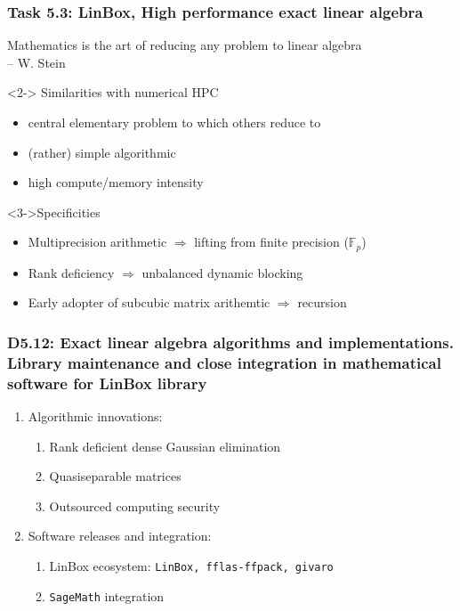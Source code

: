\documentclass{beamer}
\begin{document}
\begin{frame}
  \frametitle{Task 5.3: LinBox, High performance exact linear algebra}
  \begin{displayquote}
    Mathematics is the art of reducing any problem to linear algebra\\
    \hfill{-- W. Stein}
  \end{displayquote}

  \begin{block}<2-> {Similarities with numerical HPC}
    \begin{itemize}
    \item central elementary problem to which others reduce to
    \item (rather) simple algorithmic
    \item high compute/memory intensity
    \end{itemize}
  \end{block}
    \begin{block}<3->{Specificities}
      \begin{itemize}
      \item Multiprecision arithmetic $\Rightarrow$ lifting from finite  precision ($\mathbb{F}_p$)
      \item Rank deficiency $\Rightarrow$ unbalanced dynamic blocking
      \item Early adopter of subcubic matrix arithemtic $\Rightarrow$ recursion
      \end{itemize}
    \end{block}
      
    \end{frame}
\begin{frame}
  \frametitle{D5.12: Exact linear algebra algorithms and implementations. Library maintenance and close integration in mathematical software for LinBox library}

  \begin{enumerate}
  \item Algorithmic innovations:
    \begin{enumerate}
    \item Rank deficient dense Gaussian elimination
    \item Quasiseparable matrices
    \item Outsourced computing security
    \end{enumerate}
  \item Software releases and integration:
    \begin{enumerate}
    \item LinBox ecosystem: \texttt{LinBox, fflas-ffpack, givaro}
    \item \texttt{SageMath} integration
    \end{enumerate}
  \end{enumerate}
\end{frame}
\end{document}

